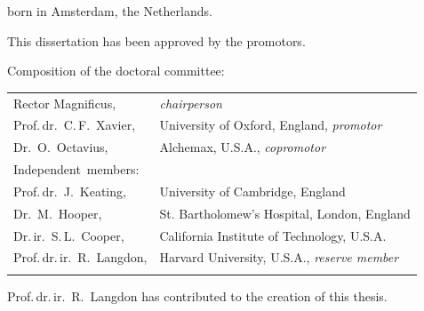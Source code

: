 \begin{titlepage}
\begin{center}
born in Amsterdam, the Netherlands.

\vspace*{2\bigskipamount}

\end{center}
\clearpage




\thispagestyle{empty}

\noindent This dissertation has been approved by the promotors.

\medskip

\noindent Composition of the doctoral committee:

\medskip\noindent
\begin{tabular}{p{4.5cm}l}
  Rector Magnificus, & \emph{chairperson} \\
  Prof.\,dr.\ C.\,F.\ Xavier, & University of Oxford, England, \emph{promotor} \\
  Dr.\ O.\ Octavius, & Alchemax, U.S.A., \emph{copromotor} \\

  \medskip
  \mbox{Independent members:} & \\
  
  Prof.\,dr.\ J.\ Keating, & University of Cambridge, England \\
  Dr.\ M.\ Hooper, & St. Bartholomew's Hospital, London, England \\
  Dr.\,ir.\ S.\,L.\ Cooper, & California Institute of Technology, U.S.A. \\
  
  Prof.\,dr.\,ir.\ R.\ Langdon, & Harvard University, U.S.A., \emph{reserve member} \\ \\

\end{tabular}

\medskip
\noindent Prof.\,dr.\,ir.\ R.\ Langdon has contributed to the creation of this thesis.


\end{titlepage}
